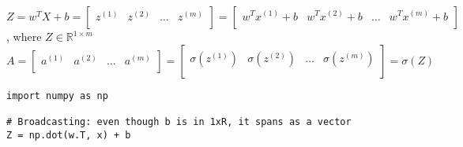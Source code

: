 \documentclass{article}
\begin{document}
$Z =
w^T X +b =
\begin{bmatrix}
z^{(1)} & z^{(2)} & \dots & z^{(m)}\\
\end{bmatrix}
= \begin{bmatrix}
w^T x^{(1)} +b & w^T x^{(2)} +b & \dots & w^T x^{(m)} + b \\
\end{bmatrix}
$\\

, where $Z \in \mathbb{R}^{1 \times m}$\\

$A =
\begin{bmatrix}
a^{(1)} & a^{(2)} & \dots & a^{(m)}\\
\end{bmatrix}
=\begin{bmatrix}
\sigma(z^{(1)}) & \sigma(z^{(2)}) & \dots & \sigma(z^{(m)})\\
\end{bmatrix} = \sigma(Z)
$\\

\lstset{language=Python}
\begin{lstlisting}
import numpy as np

# Broadcasting: even though b is in 1xR, it spans as a vector
Z = np.dot(w.T, x) + b

\end{lstlisting}
\end{document}
